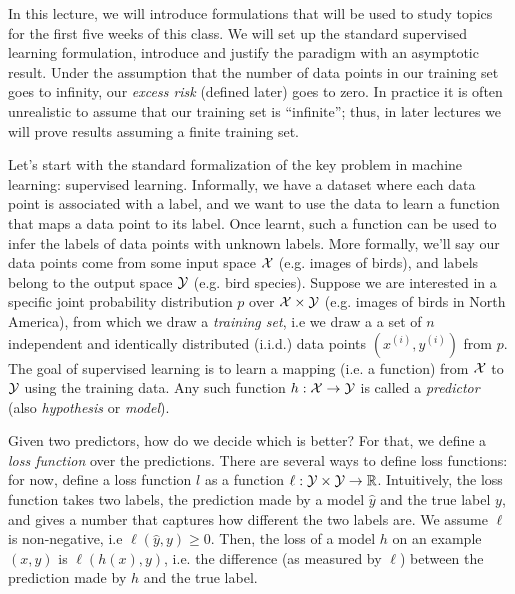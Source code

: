 \setcounter{section}{0}



\newcommand\defeq{\stackrel{\mathclap{\tiny \mbox{$\Delta$}}}{=}}


In this lecture, we will introduce formulations that will be used to study topics for the first five weeks of this class. We will set up the standard supervised learning formulation, introduce and justify the  paradigm with an asymptotic
result. Under the assumption that the number of data points in our training set goes to infinity, our \emph{excess risk} (defined later) goes to zero. In practice it is often unrealistic to assume that our training set is ``infinite''; thus, in later lectures we will prove results assuming a finite training set.

\label{lec1:sec:sup-learn}
Let's start with the standard formalization of the key problem in machine learning: supervised learning. Informally, we have a dataset where each data point is associated with a label, and we want to use the data to learn a function that maps a data point to its label. Once learnt, such a function can be used to infer the labels of data points with unknown labels. More formally, we'll say our data points come from some input space $\mathcal X$ (e.g. images of birds), and labels belong to the output space $\mathcal Y$ (e.g. bird species). Suppose we are interested in a specific joint probability distribution $p$ over $\mathcal X \times \mathcal Y$ (e.g. images of birds in North America), from which we draw a \emph{training set}, i.e we draw a a set of $n$ independent and identically distributed (i.i.d.) data points $(x^{(i)}, y^{(i)})$ from $p$. The goal of supervised learning is to learn a mapping (i.e. a function) from $\mathcal X$ to $\mathcal Y$ using the training data. Any such function $h : \mathcal X \rightarrow \mathcal Y$ is called a \emph{predictor} (also \emph{hypothesis} or \emph{model}).

Given two predictors, how do we decide which is better? For that, we define a \emph{loss function} over the predictions. There are several ways to define loss functions: for now, define a loss function $l$ as a function $\ell : \mathcal Y \times \mathcal Y \rightarrow \mathbb R$. Intuitively, the loss function takes two labels, the prediction made by a model $\hat{y}$ and the true label $y$, and gives a number that captures how different the two labels are. We assume $\ell$ is non-negative, i.e $\ell(\hat{y}, y) \geq 0$. Then, the loss of a model $h$ on an example $(x, y)$ is $\ell(h(x), y)$, i.e. the difference (as measured by $\ell$) between the prediction made by $h$ and the true label.


